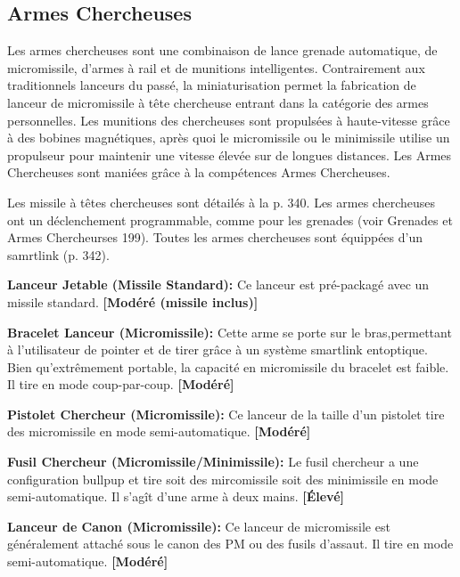 \subsection{Armes Chercheuses} \label{sec:seekers} 

Les armes chercheuses sont une combinaison de lance grenade automatique, de micromissile, d'armes à rail et de munitions intelligentes. Contrairement aux traditionnels lanceurs du passé, la miniaturisation permet la fabrication de lanceur de micromissile à tête chercheuse entrant dans la catégorie des armes personnelles. Les munitions des chercheuses sont propulsées à haute-vitesse grâce à des bobines magnétiques, après quoi le micromissile ou le minimissile utilise un propulseur pour maintenir une vitesse élevée sur de longues distances. Les Armes Chercheuses sont maniées grâce à la compétences Armes Chercheuses. 

Les missile à têtes chercheuses sont détailés à la p. 340. Les armes chercheuses ont un déclenchement programmable, comme pour les grenades (voir Grenades et Armes Chercheurses 199). Toutes les armes chercheuses sont équippées d'un samrtlink (p. 342). 

\textbf{Lanceur Jetable (Missile Standard):} Ce lanceur est pré-packagé avec un missile standard. \textbf{[Modéré (missile inclus)]} 

\textbf{Bracelet Lanceur (Micromissile):} Cette arme se porte sur le bras,permettant à l'utilisateur de pointer et de tirer grâce à un système smartlink entoptique. Bien qu'extrêmement portable, la capacité en micromissile du bracelet est faible. Il tire en mode coup-par-coup. \textbf{[Modéré]} 

\textbf{Pistolet Chercheur (Micromissile):} Ce lanceur de la taille d'un pistolet tire des micromissile en mode semi-automatique. \textbf{[Modéré]} 

\textbf{Fusil Chercheur (Micromissile/Minimissile):} Le fusil chercheur a une configuration bullpup et tire soit des mircomissile soit des minimissile en mode semi-automatique. Il s'agît d'une arme à deux mains. \textbf{[Élevé]} 

\textbf{Lanceur de Canon (Micromissile):} Ce lanceur de micromissile est généralement attaché sous le canon des PM ou des fusils d'assaut. Il tire en mode semi-automatique. \textbf{[Modéré]} 

